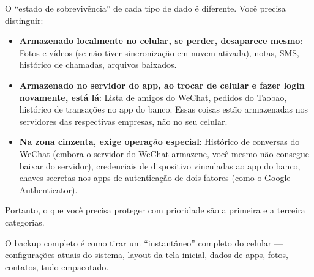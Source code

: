 


O “estado de sobrevivência” de cada tipo de dado é diferente. Você precisa distinguir:

\begin{itemize}
  \item \textbf{Armazenado localmente no celular, se perder, desaparece mesmo}: Fotos e vídeos (se não tiver sincronização em nuvem ativada), notas, SMS, histórico de chamadas, arquivos baixados.
  \item \textbf{Armazenado no servidor do app, ao trocar de celular e fazer login novamente, está lá}: Lista de amigos do WeChat, pedidos do Taobao, histórico de transações no app do banco. Essas coisas estão armazenadas nos servidores das respectivas empresas, não no seu celular.
  \item \textbf{Na zona cinzenta, exige operação especial}: Histórico de conversas do WeChat (embora o servidor do WeChat armazene, você mesmo não consegue baixar do servidor), credenciais de dispositivo vinculadas ao app do banco, chaves secretas nos apps de autenticação de dois fatores (como o Google Authenticator).
\end{itemize}

Portanto, o que você precisa proteger com prioridade são a primeira e a terceira categorias.


O backup completo é como tirar um “instantâneo” completo do celular — configurações atuais do sistema, layout da tela inicial, dados de apps, fotos, contatos, tudo empacotado.



